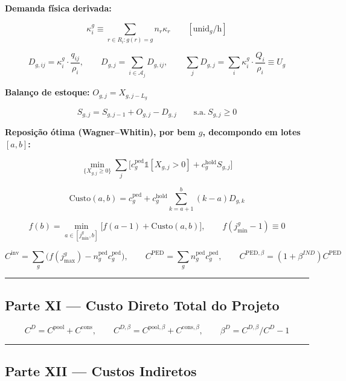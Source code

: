 \documentclass[
  10pt,
]{article}
\begin{document}
\textbf{Demanda física derivada:}

\[\kappa_i^g \equiv \sum_{r\in R_i:g(r)=g}n_r\kappa_r \qquad[\text{unid}_g/\text{h}]\]

\[\boxed{D_{g,ij}=\kappa_i^g\cdot\frac{q_{ij}}{\rho_i}}, \qquad \boxed{D_{g,j}=\sum_{i\in\mathcal{A}_j}D_{g,ij}}, \qquad \sum_jD_{g,j}=\sum_i\kappa_i^g\cdot\frac{Q_i}{\rho_i}\equiv U_g\]

\textbf{Balanço de estoque:} \(O_{g,j}=X_{g,j-L_g}\)

\[\boxed{S_{g,j}=S_{g,j-1}+O_{g,j}-D_{g,j}}\qquad\text{s.a.}\ S_{g,j}\ge0\]

\textbf{Reposição ótima (Wagner--Whitin), por bem \(g\), decompondo em
lotes \([a,b]\):}

\[\min_{\{X_{g,j}\ge0\}}\sum_j\big[c_g^{\text{ped}}\mathbb{1}[X_{g,j}>0]+c_g^{\text{hold}}S_{g,j}\big]\]

\[\boxed{\mathrm{Custo}(a,b)=c_g^{\text{ped}}+c_g^{\text{hold}}\sum_{k=a+1}^b(k-a)D_{g,k}}\]

\[\boxed{f(b)=\min_{a\in[j_{\min}^g,b]}\big[f(a-1)+\mathrm{Custo}(a,b)\big]}, \qquad f(j_{\min}^g-1)\equiv0\]

\[\boxed{C^{\mathrm{inv}}=\sum_g\big(f(j_{\max}^g)-n_g^{\text{ped}}c_g^{\text{ped}}\big)}, \qquad \boxed{C^{\mathrm{PED}}=\sum_gn_g^{\text{ped}}c_g^{\text{ped}}}, \qquad C^{\mathrm{PED},\beta}=(1+\beta^{IND})C^{\mathrm{PED}}\]

\begin{center}\rule{0.5\linewidth}{0.5pt}\end{center}

\hypertarget{parte-xi-custo-direto-total-do-projeto}{%
\subsection{Parte XI --- Custo Direto Total do
Projeto}\label{parte-xi-custo-direto-total-do-projeto}}

\[C^D=C^{\mathrm{pool}}+C^{\mathrm{cons}}, \qquad C^{D,\beta}=C^{\mathrm{pool},\beta}+C^{\mathrm{cons},\beta}, \qquad \beta^D=C^{D,\beta}/C^D-1\]

\begin{center}\rule{0.5\linewidth}{0.5pt}\end{center}

\hypertarget{parte-xii-custos-indiretos}{%
\subsection{Parte XII --- Custos
Indiretos}\label{parte-xii-custos-indiretos}}
\end{document}
